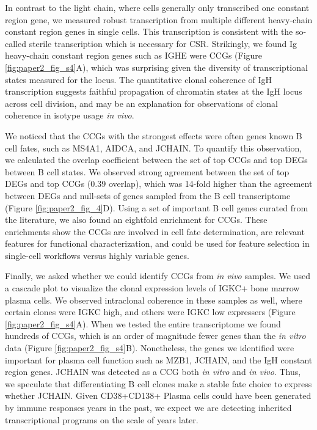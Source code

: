 In contrast to the light chain, where cells generally only transcribed one constant region gene, we measured robust transcription from multiple different heavy-chain constant region genes in single cells. This transcription is consistent with the so-called sterile transcription which is necessary for CSR\cite{lee_quantitative_2001}. Strikingly, we found Ig heavy-chain constant region genes such as IGHE were CCGs (Figure \ref{fig:paper2_fig_s4}A), which was surprising given the diversity of transcriptional states measured for the locus. The quantitative clonal coherence of IgH transcription suggests faithful propagation of chromatin states at the IgH locus across cell division, and may be an explanation for observations of clonal coherence in isotype usage \textit{in vivo}\cite{horns_lineage_2016}.

We noticed that the CCGs with the strongest effects were often genes known B cell fates, such as MS4A1, AIDCA, and JCHAIN. To quantify this observation, we calculated the overlap coefficient between the set of top CCGs and top DEGs between B cell states. We observed strong agreement between the set of top DEGs and top CCGs (0.39 overlap), which was 14-fold higher than the agreement between DEGs and null-sets of genes sampled from the B cell transcriptome (Figure \ref{fig:paper2_fig_4}D). Using a set of important B cell genes curated from the literature\cite{morgan_unraveling_2022}, we also found an eightfold enrichment for CCGs. These enrichments show the CCGs are involved in cell fate determination, are relevant features for functional characterization, and could be used for feature selection in single-cell workflows versus highly variable genes.

Finally, we asked whether we could identify CCGs from \textit{in vivo} samples. We used a cascade plot to visualize the clonal expression levels of IGKC+ bone marrow plasma cells. We observed intraclonal coherence in these samples as well, where certain clones were IGKC high, and others were IGKC low expressers (Figure \ref{fig:paper2_fig_s4}A). When we tested the entire transcriptome we found hundreds of CCGs, which is an order of magnitude fewer genes than the \textit{in vitro} data (Figure \ref{fig:paper2_fig_s4}B). Nonetheless, the genes we identified were important for plasma cell function such as MZB1, JCHAIN, and the IgH constant region genes. JCHAIN was detected as a CCG both \textit{in vitro} and \textit{in vivo}. Thus, we speculate that differentiating B cell clones make a stable fate choice to express whether JCHAIN. Given CD38+CD138+ Plasma cells could have been generated by immune responses years in the past\cite{hammarlund_plasma_2017}, we expect we are detecting inherited transcriptional programs on the scale of years later.

